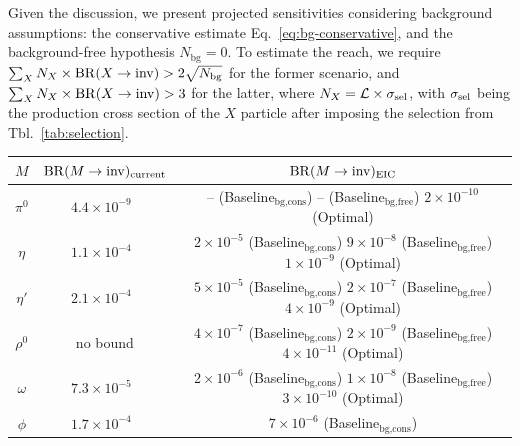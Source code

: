 \documentclass[aps,prd,preprintnumbers,superscriptaddress,nofootinbib,floatfix,twocolumn,notitlepage,reprint]{revtex4-2}
\newcommand{\inv}{{\rm inv}}
\newcommand{\cL}{\mathcal{L}}
\newcommand{\BR}{\mathrm{BR}}
\begin{document}
Given the discussion, we present projected sensitivities considering background assumptions: 
the conservative estimate Eq.~\eqref{eq:bg-conservative}, and the background-free hypothesis $N_{\text{bg}}=0$. 
To estimate the reach, we require $\sum_{X}N_{X}\times \BR(X\to\inv)>2\sqrt{N_{\text{bg}}}$ for the former scenario, and $\sum_{X}N_{X}\times \BR(X\to\inv)>3$ for the latter, where $N_{X} = \cL\times \sigma_{\rm sel}$, with $\sigma_{\rm sel}$ being the production cross section of the $X$ particle after imposing the selection from Tbl.~\ref{tab:selection}.


\begin{table}[t!]
\centering
\begin{tabular}{|c|c|c|}
\hline
$M$
& $\mathrm{BR}(M\to \mathrm{inv})_{\rm current}$
& $\mathrm{BR}(M\to \mathrm{inv})_{\rm EIC}$ \\
\hline\hline
$\pi^0$
& $4.4\times10^{-9}$~\cite{NA62:2020pwi}
& \makecell{
-- (Baseline$_{\text{bg,cons}}$)\\
-- (Baseline$_{\text{bg,free}}$)\\
$2\times10^{-10}$ (Optimal)
} \\
\hline
$\eta$
& $1.1\times10^{-4}$~\cite{NA64:2024mah}
& \makecell{
$2\times10^{-5}$ (Baseline$_{\text{bg,cons}}$)\\
$9\times10^{-8}$ (Baseline$_{\text{bg,free}}$)\\
$1\times10^{-9}$ (Optimal)
} \\
\hline
$\eta'$
& $2.1\times10^{-4}$~\cite{NA64:2024mah}
& \makecell{
$5\times10^{-5}$ (Baseline$_{\text{bg,cons}}$)\\
$2\times10^{-7}$ (Baseline$_{\text{bg,free}}$)\\
$4\times10^{-9}$ (Optimal)
} \\
\hline
$\rho^{0}$
& no bound
& \makecell{
$4\times10^{-7}$ (Baseline$_{\text{bg,cons}}$)\\
$2\times10^{-9}$ (Baseline$_{\text{bg,free}}$)\\
$4\times10^{-11}$ (Optimal)
} \\
\hline
$\omega$
& $7.3\times10^{-5}$~\cite{ParticleDataGroup:2024cfk}
& \makecell{
$2\times10^{-6}$ (Baseline$_{\text{bg,cons}}$)\\
$1\times10^{-8}$ (Baseline$_{\text{bg,free}}$)\\
$3\times10^{-10}$ (Optimal)
} \\
\hline
$\phi$
& $1.7\times10^{-4}$~\cite{ParticleDataGroup:2024cfk}
& \makecell{
$7\times10^{-6}$ (Baseline$_{\text{bg,cons}}$)\\
}
\end{tabular}
\end{table}
\end{document}
